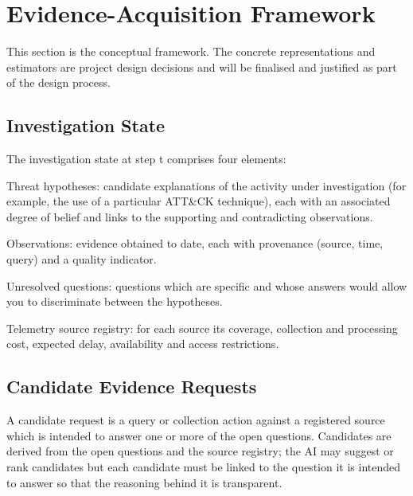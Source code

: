\documentclass[a4paper,11pt]{article}
\begin{document}
\section{Evidence-Acquisition Framework}
This section is the conceptual framework. The concrete representations and estimators are project design decisions and will be finalised and justified as part of the design process.\par
\subsection{Investigation State}
The investigation state at step t comprises four elements:\par
Threat hypotheses: candidate explanations of the activity under investigation (for example, the use of a particular ATT\&CK technique), each with an associated degree of belief and links to the supporting and contradicting observations.\par
Observations: evidence obtained to date, each with provenance (source, time, query) and a quality indicator.\par
Unresolved questions: questions which are specific and whose answers would allow you to discriminate between the hypotheses.\par
Telemetry source registry: for each source its coverage, collection and processing cost, expected delay, availability and access restrictions.\par
\subsection{Candidate Evidence Requests}
A candidate request is a query or collection action against a registered source which is intended to answer one or more of the open questions. Candidates are derived from the open questions and the source registry; the AI may suggest or rank candidates but each candidate must be linked to the question it is intended to answer so that the reasoning behind it is transparent.\par
\end{document}
